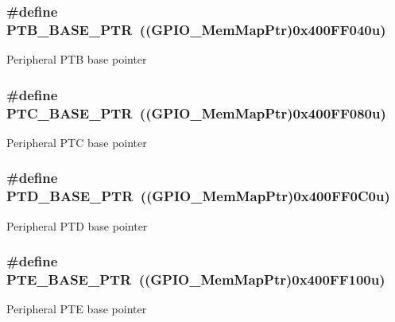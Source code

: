 \subsubsection[{P\+T\+B\+\_\+\+B\+A\+S\+E\+\_\+\+P\+T\+R}]{\setlength{\rightskip}{0pt plus 5cm}\#define P\+T\+B\+\_\+\+B\+A\+S\+E\+\_\+\+P\+T\+R~(({\bf G\+P\+I\+O\+\_\+\+Mem\+Map\+Ptr})0x400\+F\+F040u)}\label{group___g_p_i_o___peripheral_ga59ab0f28e891ea28f152505ce2021747}
Peripheral P\+T\+B base pointer \hypertarget{group___g_p_i_o___peripheral_gaaa3dc05c2a51a960067e1de6863fd3dd}{}
\subsubsection[{P\+T\+C\+\_\+\+B\+A\+S\+E\+\_\+\+P\+T\+R}]{\setlength{\rightskip}{0pt plus 5cm}\#define P\+T\+C\+\_\+\+B\+A\+S\+E\+\_\+\+P\+T\+R~(({\bf G\+P\+I\+O\+\_\+\+Mem\+Map\+Ptr})0x400\+F\+F080u)}\label{group___g_p_i_o___peripheral_gaaa3dc05c2a51a960067e1de6863fd3dd}
Peripheral P\+T\+C base pointer \hypertarget{group___g_p_i_o___peripheral_gaa61d2c33375f3becbae1353eee4c1317}{}
\subsubsection[{P\+T\+D\+\_\+\+B\+A\+S\+E\+\_\+\+P\+T\+R}]{\setlength{\rightskip}{0pt plus 5cm}\#define P\+T\+D\+\_\+\+B\+A\+S\+E\+\_\+\+P\+T\+R~(({\bf G\+P\+I\+O\+\_\+\+Mem\+Map\+Ptr})0x400\+F\+F0\+C0u)}\label{group___g_p_i_o___peripheral_gaa61d2c33375f3becbae1353eee4c1317}
Peripheral P\+T\+D base pointer \hypertarget{group___g_p_i_o___peripheral_gaa230685f72ad1540850ab8d12366775c}{}
\subsubsection[{P\+T\+E\+\_\+\+B\+A\+S\+E\+\_\+\+P\+T\+R}]{\setlength{\rightskip}{0pt plus 5cm}\#define P\+T\+E\+\_\+\+B\+A\+S\+E\+\_\+\+P\+T\+R~(({\bf G\+P\+I\+O\+\_\+\+Mem\+Map\+Ptr})0x400\+F\+F100u)}\label{group___g_p_i_o___peripheral_gaa230685f72ad1540850ab8d12366775c}
Peripheral P\+T\+E base pointer \hypertarget{group___g_p_i_o___peripheral_ga77d3c9297d0f81182ffcc68c0096eb1a}{}
